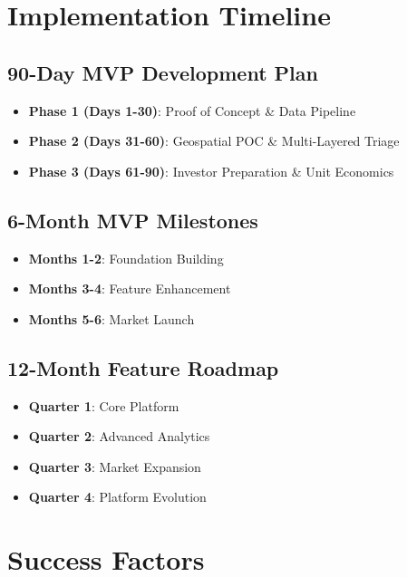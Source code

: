 \documentclass[11pt,a4paper]{book}
\begin{document}
\chapter{Implementation Timeline}
\label{app:implementation-timeline}

\section{90-Day MVP Development Plan}
\begin{itemize}
    \item \textbf{Phase 1 (Days 1-30)}: Proof of Concept \& Data Pipeline
    \item \textbf{Phase 2 (Days 31-60)}: Geospatial POC \& Multi-Layered Triage
    \item \textbf{Phase 3 (Days 61-90)}: Investor Preparation \& Unit Economics
\end{itemize}

\section{6-Month MVP Milestones}
\begin{itemize}
    \item \textbf{Months 1-2}: Foundation Building
    \item \textbf{Months 3-4}: Feature Enhancement
    \item \textbf{Months 5-6}: Market Launch
\end{itemize}

\section{12-Month Feature Roadmap}
\begin{itemize}
    \item \textbf{Quarter 1}: Core Platform
    \item \textbf{Quarter 2}: Advanced Analytics
    \item \textbf{Quarter 3}: Market Expansion
    \item \textbf{Quarter 4}: Platform Evolution
\end{itemize}

\chapter{Success Factors}
\label{app:success-factors}
\end{document}
